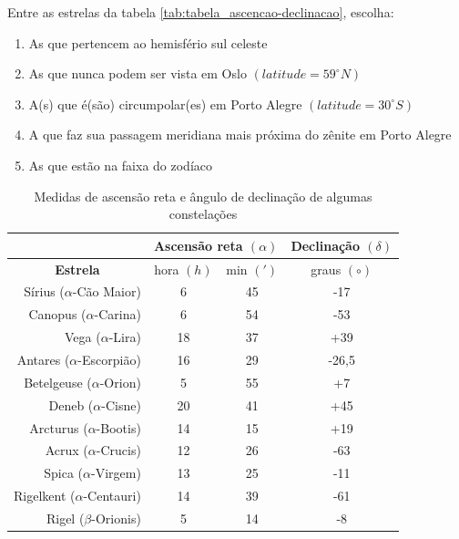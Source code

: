 \begin{prob}
	Entre as estrelas da tabela \eqref{tab:tabela_ascencao-declinacao}, escolha:
	\begin{enumerate}[label=\alph *)]
		\item As que pertencem ao hemisfério sul celeste
		\item As que nunca podem ser vista em Oslo $(latitude=59^{\circ}N)$
		\item A(s) que é(são) circumpolar(es) em Porto Alegre $(latitude=30^{\circ}S)$
		\item A que faz sua passagem meridiana mais próxima do zênite em Porto Alegre
		\item As que estão na faixa do zodíaco
	\end{enumerate}
	\begin{table}[!ht]
		\centering
		\caption{Medidas de ascensão reta e ângulo de declinação de algumas constelações}
		\label{tab:tabela_ascencao-declinacao}
		\begin{tabular}{r|cc|c|}
		\cline{2-4}
		\multicolumn{1}{l|}{}                  & \multicolumn{2}{c|}{\textbf{Ascensão reta $(\alpha)$}} & \textbf{Declinação $(\delta)$} \\ \hline
		\multicolumn{1}{|c|}{\textbf{Estrela}} & \multicolumn{1}{c|}{hora $(h)$}    & min $(\prime)$    & graus $(\circ)$                \\ \hline
		\multicolumn{1}{|r|}{Sírius ($\alpha$-Cão Maior)}  & \multicolumn{1}{c|}{6}  & 45 & -17   \\ \hline
		\multicolumn{1}{|r|}{Canopus ($\alpha$-Carina)}     & \multicolumn{1}{c|}{6}  & 54 & -53   \\ \hline
		\multicolumn{1}{|r|}{Vega ($\alpha$-Lira)}         & \multicolumn{1}{c|}{18} & 37 & +39   \\ \hline
		\multicolumn{1}{|r|}{Antares ($\alpha$-Escorpião)} & \multicolumn{1}{c|}{16} & 29 & -26,5 \\ \hline
		\multicolumn{1}{|r|}{Betelgeuse ($\alpha$-Orion)}  & \multicolumn{1}{c|}{5}  & 55 & +7    \\ \hline
		\multicolumn{1}{|r|}{Deneb ($\alpha$-Cisne)}        & \multicolumn{1}{c|}{20} & 41 & +45    \\ \hline
		\multicolumn{1}{|r|}{Arcturus ($\alpha$-Bootis)}   & \multicolumn{1}{c|}{14} & 15 & +19   \\ \hline
		\multicolumn{1}{|r|}{Acrux ($\alpha$-Crucis)}      & \multicolumn{1}{c|}{12} & 26 & -63   \\ \hline
		\multicolumn{1}{|r|}{Spica ($\alpha$-Virgem)}      & \multicolumn{1}{c|}{13} & 25 & -11   \\ \hline
		\multicolumn{1}{|r|}{Rigelkent ($\alpha$-Centauri)} & \multicolumn{1}{c|}{14} & 39 & -61   \\ \hline
		\multicolumn{1}{|r|}{Rigel ($\beta$-Orionis)}      & \multicolumn{1}{c|}{5}  & 14 & -8    \\ \hline
		\end{tabular}
		\end{table}
\end{prob}

